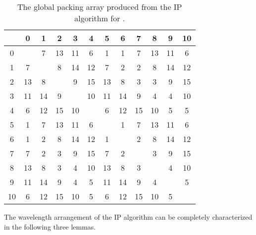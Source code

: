 \documentclass[journal,draftcls,onecolumn,12pt,twoside]{IEEEtran}
\begin{document}
\begin{table}[h]\label{tab:C11}
\scriptsize
\begin{tabular}{c|ccccccccccc}
 & 0 & 1 & 2 & 3 & 4 & 5 & 6 & 7 & 8 & 9 & 10 \\ \hline
0 &  & 7 & 13 & 11 & 6 & 1 & 1 & 7 & 13 & 11 & 6 \\
1 & 7 &  & 8 & 14 & 12 & 7 & 2 & 2 & 8 & 14 & 12 \\
2 & 13 & 8 &  & 9 & 15 & 13 & 8 & 3 & 3 & 9 & 15 \\
3 & 11 & 14 & 9 &  & 10 & 11 & 14 & 9 & 4 & 4 & 10 \\
4 & 6 & 12 & 15 & 10 &  & 6 & 12 & 15 & 10 & 5 & 5 \\
5 & 1 & 7 & 13 & 11 & 6 &  & 1 & 7 & 13 & 11 & 6 \\
6 & 1 & 2 & 8 & 14 & 12 & 1 &  & 2 & 8 & 14 & 12 \\
7 & 7 & 2 & 3 & 9 & 15 & 7 & 2 &  & 3 & 9 & 15 \\
8 & 13 & 8 & 3 & 4 & 10 & 13 & 8 & 3 &  & 4 & 10 \\
9 & 11 & 14 & 9 & 4 & 5 & 11 & 14 & 9 & 4 &  & 5 \\
10 & 6 & 12 & 15 & 10 & 5 & 6 & 12 & 15 & 10 & 5 &  \\
\end{tabular}
\normalsize
\caption{The global packing array produced from the IP algorithm for .}
\end{table}

The wavelength arrangement of the IP algorithm can be completely characterized in the following three lemmas.
\end{document}
